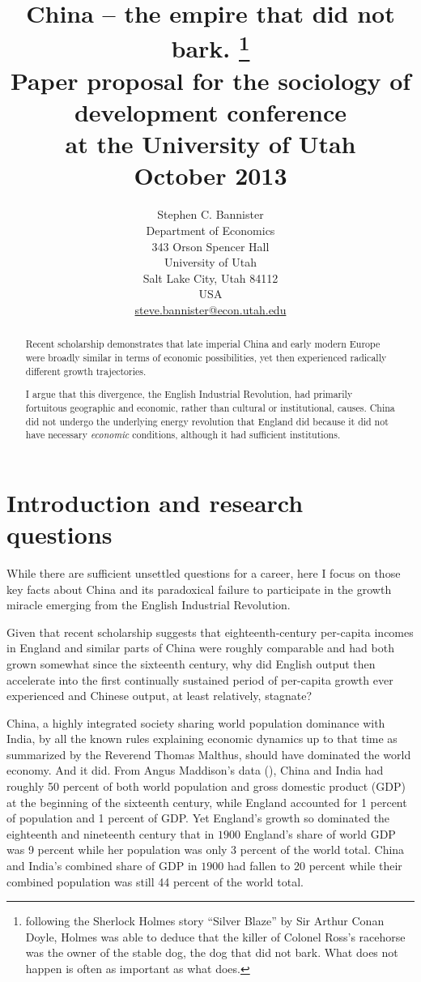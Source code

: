\documentclass[12pt]{article}
\title{China -- the empire that did not bark. \footnote{following the Sherlock Holmes story ``Silver Blaze'' by Sir Arthur Conan Doyle, Holmes was able to deduce that the killer of Colonel Ross's racehorse was the owner of the stable dog, the dog that did not bark. What does not happen is often as important as what does.}\\ Paper proposal for the sociology of development conference\\at the University of Utah\\October 2013 \\
}
\author{Stephen C. Bannister\\
	Department of Economics\\
	343 Orson Spencer Hall\\
	University of Utah\\
	Salt Lake City, Utah 84112\\
	USA\\
	\href{mailto:steve.bannister@econ.utah.edu}{steve.bannister@econ.utah.edu}\\
	}
\date{}
\numberwithin{equation}{section}
\begin{document}

\graphicspath{{../images/}}

%
	\maketitle

\newpage
	\begin{abstract}
	Recent scholarship demonstrates that late imperial China and early modern Europe were broadly similar in terms of economic possibilities, yet then experienced radically different growth trajectories.
	
	I argue that this divergence, the English Industrial Revolution, had primarily fortuitous geographic and economic, rather than cultural or institutional, causes. China did not undergo the underlying energy revolution that England did because it did not have necessary \textit{economic} conditions, although it had sufficient institutions.
	\end{abstract}
	\section*{Introduction and research questions}
	While there are sufficient unsettled questions for a career, here I focus on those key facts about China and its paradoxical failure to participate in the growth miracle emerging from the English Industrial Revolution.

	Given that recent scholarship suggests that eighteenth-century per-capita incomes in England and similar parts of China were roughly comparable and had both grown somewhat since the sixteenth century, why did English output then accelerate into the first continually sustained period of per-capita growth ever experienced and Chinese output, at least relatively, stagnate? 
	
	China, a highly integrated society sharing world population dominance with India, by all the known rules explaining economic dynamics up to that time as summarized by the Reverend Thomas Malthus, should have dominated the world economy. And it did. From Angus Maddison's data (\citeyear{maddison_maddison_2010}), China and India had roughly 50 percent of both world population and gross domestic product (GDP) at the beginning of the sixteenth century, while England accounted for 1 percent of population and 1 percent of GDP. Yet England's growth so dominated the eighteenth and nineteenth century that in $1900$ England's share of world GDP was 9 percent while her population was only 3 percent of the world total. China and India's combined share of GDP in $1900$ had fallen to 20 percent while their combined population was still 44 percent of the world total. %
	
\end{document}
